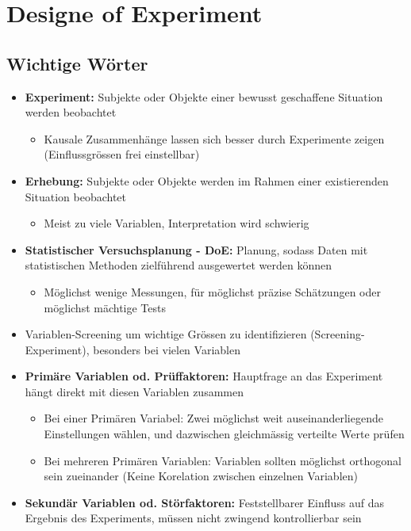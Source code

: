 \section{Designe of Experiment}
\subsection{Wichtige Wörter}
\begin{itemize}
	\item \textbf{Experiment:} Subjekte oder Objekte einer bewusst geschaffene Situation werden beobachtet
	\begin{itemize}
		\item Kausale Zusammenhänge lassen sich besser durch Experimente zeigen (Einflussgrössen frei einstellbar)
	\end{itemize}
	\item \textbf{Erhebung:} Subjekte oder Objekte werden im Rahmen einer existierenden Situation beobachtet
	\begin{itemize}
		\item Meist zu viele Variablen, Interpretation wird schwierig
	\end{itemize}
	\item \textbf{Statistischer Versuchsplanung - DoE:} Planung, sodass Daten mit statistischen Methoden zielführend ausgewertet werden können
	\begin{itemize}
		\item Möglichst wenige Messungen, für möglichst präzise Schätzungen oder möglichst mächtige Tests
	\end{itemize}
	\item Variablen-Screening um wichtige Grössen zu identifizieren (Screening-Experiment), besonders bei vielen Variablen
	\item \textbf{Primäre Variablen od. Prüffaktoren:} Hauptfrage an das Experiment hängt direkt mit diesen Variablen zusammen
	\begin{itemize}
		\item Bei einer Primären Variabel: Zwei möglichst weit auseinanderliegende Einstellungen wählen, und dazwischen gleichmässig verteilte Werte prüfen
		\item Bei mehreren Primären Variablen: Variablen sollten möglichst orthogonal sein zueinander (Keine Korelation zwischen einzelnen Variablen)
	\end{itemize}
	\item \textbf{Sekundär Variablen od. Störfaktoren:} Feststellbarer Einfluss auf das Ergebnis des Experiments, müssen nicht zwingend kontrollierbar sein

\end{itemize}
